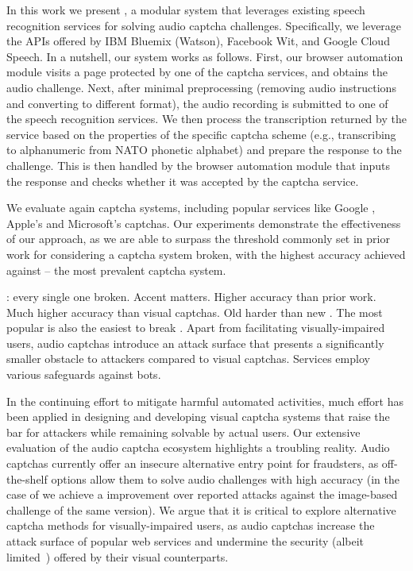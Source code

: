 In this work we present \system, a modular system that leverages existing speech recognition services
for solving audio captcha challenges. Specifically, we leverage the
APIs offered by IBM Bluemix (Watson), Facebook Wit, and Google Cloud Speech. In a nutshell, our system works as
follows. First, our browser automation module visits a page protected by one of the captcha services,
and obtains the audio challenge. Next, after minimal preprocessing (removing audio instructions and 
converting to different format), the audio recording is submitted 
to one of the speech recognition services. We then process the transcription returned by the service
based on the properties of the specific captcha scheme (e.g., transcribing to alphanumeric 
from NATO phonetic alphabet) and prepare the response to the challenge. This is then handled by
the browser automation module that inputs the response and checks whether it was accepted by the captcha
service.

We evaluate \system again \no captcha systems, including popular services like Google \re,
Apple's and Microsoft's captchas. Our experiments demonstrate the effectiveness of our approach,
as we are able to  surpass the threshold commonly set in prior work for considering
a captcha system broken, with the highest accuracy achieved against \re -- the most prevalent 
captcha system.

: every single one broken. Accent matters. Higher accuracy than prior work. Much higher accuracy than
visual captchas. Old \re harder than new \re. The most popular is also the easiest to break .
Apart from facilitating visually-impaired users, audio captchas introduce an attack
surface that presents a significantly smaller obstacle to attackers compared to visual captchas.
Services employ various safeguards against bots.

In the continuing effort to mitigate harmful automated activities, much effort has been applied in 
designing and developing visual captcha systems that raise the bar for attackers while remaining 
solvable by actual users. Our extensive evaluation of the audio captcha ecosystem highlights
a troubling reality. Audio captchas currently offer an insecure alternative entry point for fraudsters,
as off-the-shelf options allow them to solve audio challenges with high accuracy (in the case of \re
we achieve a  improvement over reported attacks against the image-based challenge of the same version). 
We argue that it is critical to explore alternative captcha methods for visually-impaired users,
as audio captchas increase the attack surface of popular web services and undermine the security
(albeit limited~\cite{185128,sivakorn:eurosp16}) offered by their visual counterparts.

